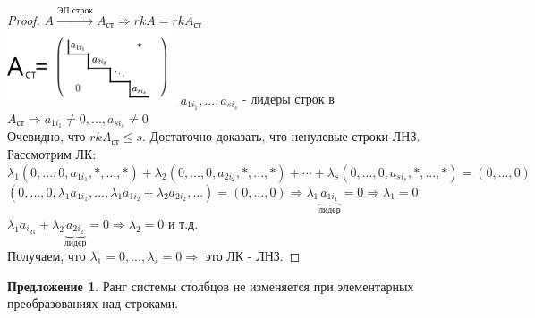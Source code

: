 \documentclass[a4paper, 12pt]{article}
\newcounter{offercount}
\theoremstyle{definition}
\newtheorem{offernum}[offercount]{Предложение}
\begin{document}
  \begin{proof}
    $A \overset{\text{ЭП строк}}{\longrightarrow } A_{\text{ст}} \Longrightarrow  rkA = rkA_{\text{ст}}$ \\
    \includegraphics[width=5cm]{image/matr2.pdf}
    $a_{1i_1},...,a_{si_s}$ - лидеры строк в $A_{\text{ст}} \Longrightarrow a_{1i_1} \neq 0,...,a_{si_s} \neq 0$ \\
    Очевидно, что $rkA_{\text{ст}}\leq s$. Достаточно доказать, что ненулевые строки ЛНЗ. 
    Рассмотрим ЛК: \\
    $\lambda_1(0,...,0,a_{1i_1},\ast,...,\ast) + \lambda_2(0,...,0,a_{2i_2},\ast,...,\ast) + \cdots + \lambda_s(0,...,0,a_{si_s},\ast,...,\ast) = (0,...,0)$ \\
    $(0,...,0,\lambda_1 a_{1i_1},...,\lambda_1a_{1i_2} + \lambda_2a_{2i_2},...) = (0,...,0) \Longrightarrow \lambda_1 \underbrace {a_{1i_1}}_{\text{лидер}}= 0 \Longrightarrow \lambda_1 = 0$ \\
    $\lambda_1a_{i_21} + \lambda_2\underbrace {a_{2i_2}}_{\text{лидер}} = 0 \Longrightarrow \lambda_2 = 0$ и т.д. \\
    Получаем, что $\lambda_1 = 0,...,\lambda_s = 0 \Longrightarrow$ это ЛК - ЛНЗ. 
  \end{proof} 
  \begin{offernum}
    Ранг системы столбцов не изменяется при элементарных преобразованиях над строками.
  \end{offernum}
\end{document}
